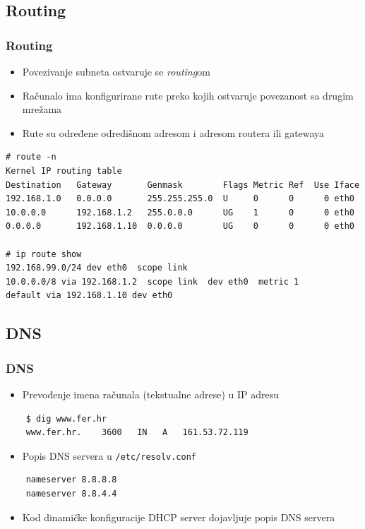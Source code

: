 \documentclass[t,table,usenames,dvipsnames]{beamer}
\begin{document}
\subsection{Routing}
\begin{frame}[fragile]
	\frametitle{Routing}
	\begin{itemize}
		\item Povezivanje subneta ostvaruje se \emph{routing}om
		\item Računalo ima konfigurirane rute preko kojih ostvaruje povezanost sa drugim mrežama
	\end{itemize}
	\begin{itemize}
		\item Rute su određene odredišnom adresom i adresom routera ili gatewaya
	\end{itemize}
	{\footnotesize \begin{verbatim}
# route -n
Kernel IP routing table
Destination   Gateway       Genmask        Flags Metric Ref  Use Iface
192.168.1.0   0.0.0.0       255.255.255.0  U     0      0      0 eth0
10.0.0.0      192.168.1.2   255.0.0.0      UG    1      0      0 eth0
0.0.0.0       192.168.1.10  0.0.0.0        UG    0      0      0 eth0

# ip route show
192.168.99.0/24 dev eth0  scope link
10.0.0.0/8 via 192.168.1.2  scope link  dev eth0  metric 1
default via 192.168.1.10 dev eth0
	\end{verbatim} }
\end{frame}

\subsection{DNS}
\begin{frame}[fragile]
	\frametitle{DNS}
	\begin{itemize}
		\item Prevođenje imena računala (tekstualne adrese) u IP adresu
	\end{itemize}
	\begin{verbatim}
    $ dig www.fer.hr
    www.fer.hr.    3600   IN   A   161.53.72.119
	\end{verbatim}
	\begin{itemize}
		\item Popis DNS servera u \texttt{/etc/resolv.conf}
	\end{itemize}
	\begin{verbatim}
    nameserver 8.8.8.8
    nameserver 8.8.4.4
	\end{verbatim}
	\begin{itemize}
		\item Kod dinamičke konfiguracije DHCP server dojavljuje popis DNS servera
	\end{itemize}
\end{frame}
\end{document}
